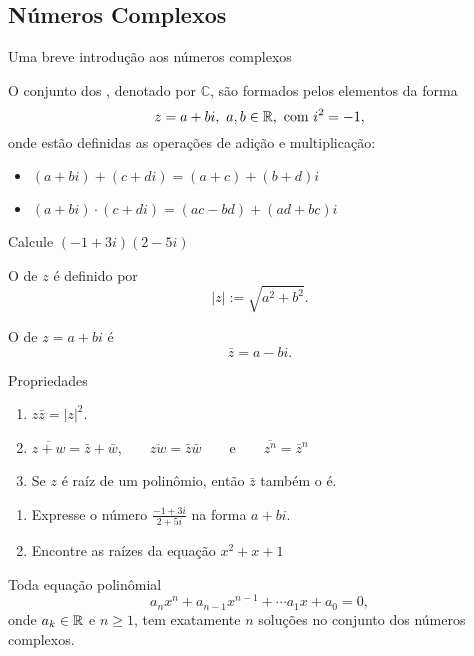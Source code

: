 \subsection*{Números Complexos}


\begin{frame}{Uma breve introdução aos números complexos\footnotemark}

 O conjunto dos , denotado por  $\mathbb{C}$, são formados pelos elementos da forma
\[z=a+bi,\ a,b\in \mathbb{R}, \text{ com }  i^2=-1,\]
onde estão definidas as operações de adição e multiplicação:
\begin{itemize}
\item $(a+bi)+(c+di)=(a+c)+(b+d)i$
\item $(a+bi)\cdot(c+di)=(ac-bd)+(ad+bc)i$
\end{itemize}

\begin{exe}
 Calcule $(-1+3i)(2-5i)$
\end{exe}

\end{frame}


\begin{frame}
O   de $z$ é definido por 
\[|z|:=\sqrt{a^2+b^2}.\] 

O  de $z=a+bi$ é 
\[\bar{z}=a-bi.\]


\begin{block}{Propriedades}
\begin{enumerate}
\item $z\bar{z}=|z|^2$.
\item $\overline{z+w}=\bar{z}+\bar{w}$,\ \ \ \ $\overline{zw}=\bar{z}\bar{w}$\ \ \ \ e\ \ \ \ $\overline{z^n}=\bar{z}^n$

\item Se $z$ é raíz de um polinômio, então $\bar{z}$ também o é.
\end{enumerate}
\end{block}



\end{frame}

\begin{frame}
\begin{exe}
\begin{enumerate}
\item Expresse o número $\frac{-1+3i}{2+5i}$ na forma $a+bi$.

\item Encontre as raízes da equação $x^2+x+1$
\end{enumerate}
\end{exe}

\begin{teo}
Toda equação polinômial 
\[a_nx^n+a_{n-1}x^{n-1}+\cdots a_1x+a_0=0,\]
onde $a_k\in \mathbb{R}$ e $n\geq 1$, tem exatamente $n$ soluções no conjunto dos números complexos.
\end{teo}
\end{frame}

